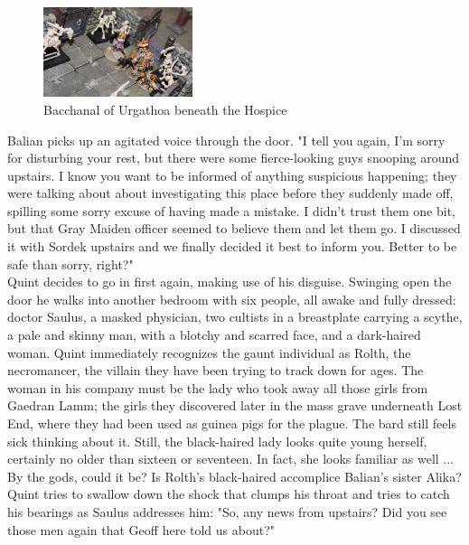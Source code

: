 \begin{figure}[h]
	\centering
	\includegraphics[width=0.39\textwidth]{images/Bacchanal-of-Urgathoa-beneath-the-Hospice-520054146 .jpg}
	\caption{Bacchanal of Urgathoa beneath the Hospice}
	\label{fig:Bacchanal-of-Urgathoa-beneath-the-Hospice-520054146 }
\end{figure}

Balian picks up an agitated voice through the door. "I tell you again, I'm sorry for disturbing your rest, but there were some fierce-looking guys snooping around upstairs. I know you want to be informed of anything suspicious happening; they were talking about about investigating this place before they suddenly made off, spilling some sorry excuse of having made a mistake. I didn't trust them one bit, but that Gray Maiden officer seemed to believe them and let them go. I discussed it with Sordek upstairs and we finally decided it best to inform you. Better to be safe than sorry, right?"\\

Quint decides to go in first again, making use of his disguise. Swinging open the door he walks into another bedroom with six people, all awake and fully dressed: doctor Saulus, a masked physician, two cultists in a breastplate carrying a scythe, a pale and skinny man, with a blotchy and scarred face, and a dark-haired woman. Quint immediately recognizes the gaunt individual as Rolth, the necromancer, the villain they have been trying to track down for ages. The woman in his company must be the lady who took away all those girls from Gaedran Lamm; the girls they discovered later in the mass grave underneath Lost End, where they had been used as guinea pigs for the plague. The bard still feels sick thinking about it. Still, the black-haired lady looks quite young herself, certainly no older than sixteen or seventeen. In fact, she looks familiar as well ... By the gods, could it be? Is Rolth's black-haired accomplice Balian's sister Alika? Quint tries to swallow down the shock that clumps his throat and tries to catch his bearings as Saulus addresses him: "So, any news from upstairs? Did you see those men again that Geoff here told us about?"\\

